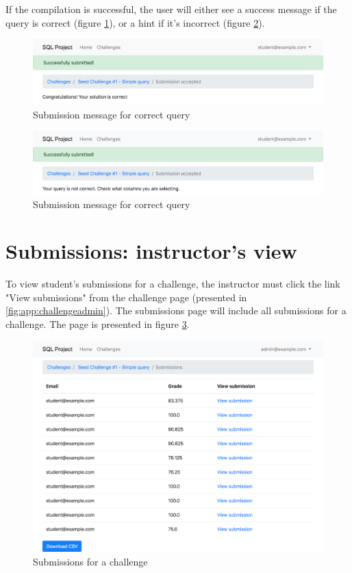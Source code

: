 If the compilation is successful, the user will either see a success message if the query is correct (figure \ref{fig:app:submit_correct}), or a hint if it's incorrect (figure \ref{fig:app:submit_incorrect}).

\begin{figure}[H]
    \centering
    \includegraphics[width=\textwidth/4*3]{Appendices/submit_correct.png}
    \caption{Submission message for correct query}
    \label{fig:app:submit_correct}
\end{figure}

\begin{figure}[H]
    \centering
    \includegraphics[width=\textwidth/4*3]{Appendices/submit_hint.png}
    \caption{Submission message for correct query}
    \label{fig:app:submit_incorrect}
\end{figure}

\section{Submissions: instructor's view}

To view student's submissions for a challenge, the instructor must click the link "View submissions" from the challenge page (presented in \ref{fig:app:challengeadmin}). The submissions page will include all submissions for a challenge. The page is presented in figure \ref{fig:app:submissions}.

\begin{figure}[ht]
    \centering
    \includegraphics[width=\textwidth/4*3]{Appendices/submissions.png}
    \caption{Submissions for a challenge}
    \label{fig:app:submissions}
\end{figure}

